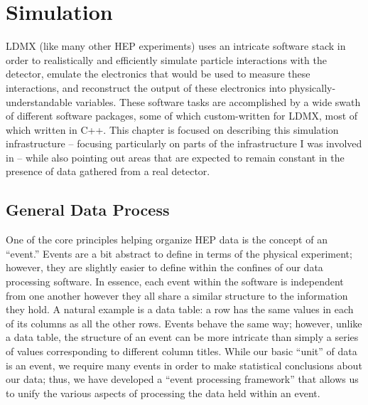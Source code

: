 \chapter{Simulation}
\label{chapter:ldmx:simulation}


LDMX (like many other HEP experiments) uses an intricate software stack in order to realistically and efficiently simulate particle interactions with the detector, emulate the electronics that would be used to measure these interactions, and reconstruct the output of these electronics into physically-understandable variables.
These software tasks are accomplished by a wide swath of different software packages, some of which custom-written for LDMX, most of which written in C++.
This chapter is focused on describing this simulation infrastructure -- focusing particularly on parts of the infrastructure I was involved in -- while also pointing out areas that are expected to remain constant in the presence of data gathered from a real detector.

\section{General Data Process}
One of the core principles helping organize HEP data is the concept of an ``event.''
Events are a bit abstract to define in terms of the physical experiment; however, they are slightly easier to define within the confines of our data processing software.
In essence, each event within the software is independent from one another however they all share a similar structure to the information they hold. A natural example is a data table: a row has the same values in each of its columns as all the other rows. Events behave the same way; however, unlike a data table, the structure of an event can be more intricate than simply a series of values corresponding to different column titles.
While our basic ``unit'' of data is an event, we require many events in order to make statistical conclusions about our data; thus, we have developed a ``event processing framework'' that allows us to unify the various aspects of processing the data held within an event.

